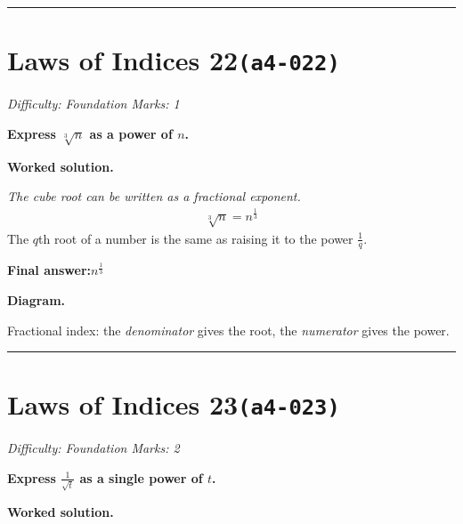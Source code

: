 \documentclass[11pt]{article}
\newcommand{\question}[1]{\par\medskip\noindent\textbf{#1}\par}
\begin{document}
\medskip\hrule

\section*{Laws of Indices 22\quad\small\texttt{(a4-022)}}
\textit{Difficulty: Foundation \quad\textbar\quad Marks: 1}

\question{Express \( \sqrt[3]{n} \) as a power of \( n \).}

\textbf{Worked solution.}

\textit{The cube root can be written as a fractional exponent.}
\[\begin{gathered}
\sqrt[3]{n} = n^{\frac{1}{3}}
\end{gathered}\]
The \( q \)th root of a number is the same as raising it to the power \( \frac{1}{q} \).

\begin{answerbox}
\textbf{Final answer:}\quad \(\displaystyle n^{\frac{1}{3}}\)
\end{answerbox}
\textbf{Diagram.}

\begin{center}
\end{center}
\small Fractional index: the \emph{denominator} gives the root, the \emph{numerator} gives the power.\normalsize

\medskip\hrule

\section*{Laws of Indices 23\quad\small\texttt{(a4-023)}}
\textit{Difficulty: Foundation \quad\textbar\quad Marks: 2}

\question{Express \( \frac{1}{\sqrt{t}} \) as a single power of \( t \).}

\textbf{Worked solution.}
\end{document}
